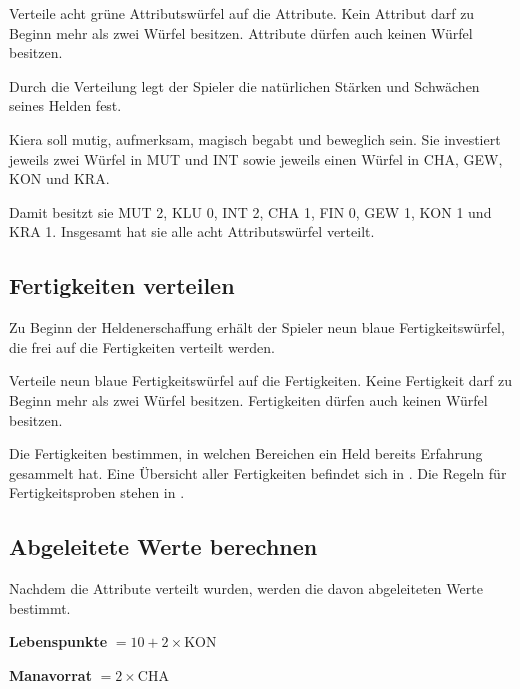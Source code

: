\begin{kurzregel}[title=Attribute verteilen]
Verteile acht grüne Attributswürfel auf die Attribute. Kein Attribut darf zu Beginn mehr als zwei Würfel besitzen. Attribute dürfen auch keinen Würfel besitzen.
\end{kurzregel}

Durch die Verteilung legt der Spieler die natürlichen Stärken und Schwächen seines Helden fest.

\begin{beispiel}[title=Kieras Attribute]
Kiera soll mutig, aufmerksam, magisch begabt und beweglich sein. Sie investiert jeweils zwei Würfel in MUT und INT sowie jeweils einen Würfel in CHA, GEW, KON und KRA.

Damit besitzt sie MUT 2, KLU 0, INT 2, CHA 1, FIN 0, GEW 1, KON 1 und KRA 1. Insgesamt hat sie alle acht Attributswürfel verteilt.
\end{beispiel}

\subsection{Fertigkeiten verteilen}

Zu Beginn der Heldenerschaffung erhält der Spieler neun blaue Fertigkeitswürfel, die frei auf die Fertigkeiten verteilt werden.

\begin{kurzregel}[title=Fertigkeiten verteilen]
Verteile neun blaue Fertigkeitswürfel auf die Fertigkeiten. Keine Fertigkeit darf zu Beginn mehr als zwei Würfel besitzen. Fertigkeiten dürfen auch keinen Würfel besitzen.
\end{kurzregel}

Die Fertigkeiten bestimmen, in welchen Bereichen ein Held bereits Erfahrung gesammelt hat. Eine Übersicht aller Fertigkeiten befindet sich in . Die Regeln für Fertigkeitsproben stehen in .

\subsection{Abgeleitete Werte berechnen}

Nachdem die Attribute verteilt wurden, werden die davon abgeleiteten Werte bestimmt.

\begin{kurzregel}[title=Abgeleitete Werte]
\textbf{Lebenspunkte} $= 10 + 2 \times \mathrm{KON}$

\textbf{Manavorrat} $= 2 \times \mathrm{CHA}$
\end{kurzregel}

